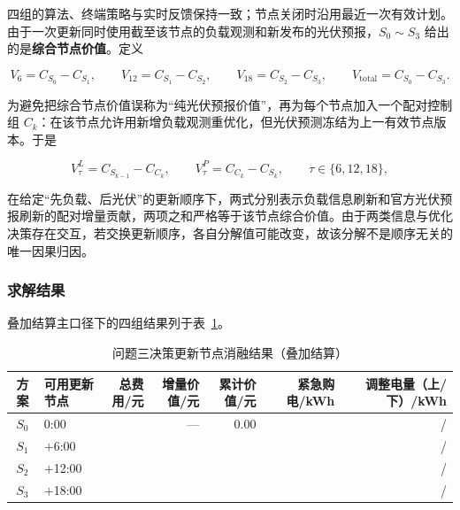 四组的算法、终端策略与实时反馈保持一致；节点关闭时沿用最近一次有效计划。由于一次更新同时使用截至该节点的负载观测和新发布的光伏预报，$S_0\sim S_3$ 给出的是\textbf{综合节点价值}。定义

\begin{equation}
	V_{6}=C_{S_0}-C_{S_1},\qquad
	V_{12}=C_{S_1}-C_{S_2},\qquad
	V_{18}=C_{S_2}-C_{S_3},\qquad
	V_{\text{total}}=C_{S_0}-C_{S_3}.
	\label{eq:q3-value}
\end{equation}

为避免把综合节点价值误称为“纯光伏预报价值”，再为每个节点加入一个配对控制组 $C_k$：在该节点允许用新增负载观测重优化，但光伏预测冻结为上一有效节点版本。于是

\begin{equation}
	V^{L}_{\tau}=C_{S_{k-1}}-C_{C_k},\qquad
	V^{P}_{\tau}=C_{C_k}-C_{S_k},\qquad
	\tau\in\{6,12,18\},
	\label{eq:q3-paired-value}
\end{equation}

在给定“先负载、后光伏”的更新顺序下，两式分别表示负载信息刷新和官方光伏预报刷新的配对增量贡献，两项之和严格等于该节点综合价值。由于两类信息与优化决策存在交互，若交换更新顺序，各自分解值可能改变，故该分解不是顺序无关的唯一因果归因。

\subsubsection{求解结果}

叠加结算主口径下的四组结果列于表~\ref{tab:q3-ablation}。

\begin{table}[htbp]
	\caption{问题三决策更新节点消融结果（叠加结算）}
	\label{tab:q3-ablation}
	\centering
	\begin{tabular}{c l r r r r r}
		\toprule
		方案 & 可用更新节点 & 总费用/元 & 增量价值/元 & 累计价值/元 & 紧急购电/kWh & 调整电量（上/下）/kWh \\
		\midrule
		$S_0$ & 0:00 & \QthreeSzero & --- & 0.00 & \QthreeSzeroEm & \QthreeSzeroUp/\QthreeSzeroDown \\
		$S_1$ & $+$6:00 & \QthreeSone & \QthreeVsix & \QthreeVsix & \QthreeSoneEm & \QthreeSoneUp/\QthreeSoneDown \\
		$S_2$ & $+$12:00 & \QthreeStwo & \QthreeVtwelve & \QthreeVtwelveCum & \QthreeStwoEm & \QthreeStwoUp/\QthreeStwoDown \\
		$S_3$ & $+$18:00 & \QthreeSthree & \QthreeVeighteen & \QthreeVtotal & \QthreeEmergency & \QthreeUp/\QthreeDown \\
		\bottomrule
	\end{tabular}
\end{table}


